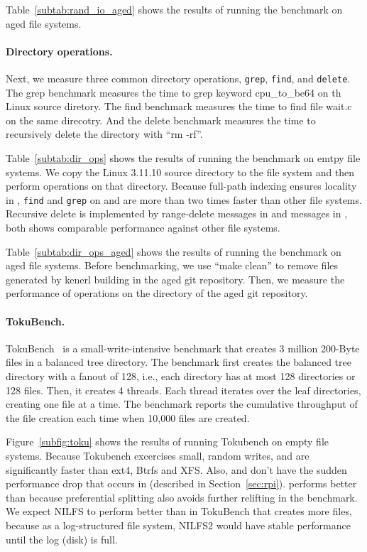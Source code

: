 Table~\ref{subtab:rand_io_aged} shows the results of running the benchmark on
aged file systems.

\paragraph{Directory operations.}
Next, we measure three common directory operations,
\texttt{grep}, \texttt{find}, and \texttt{delete}.
The grep benchmark measures the time to grep keyword cpu\_to\_be64 on th
Linux source diretory.
The find benchmark measures the time to find file wait.c on the same direcotry.
And the delete benchmark measures the time to recursively delete the directory
with ``rm -rf''.

Table~\ref{subtab:dir_ops} shows the results of running the benchmark on emtpy
file systems.
We copy the Linux 3.11.10 source directory to the file system and then
perform operations on that directory.
Because full-path indexing ensures locality in \betrfs, \texttt{find} and
\texttt{grep} on \betrfsFour and \betrfsFive are more than two times faster than
other file systems.
Recursive delete is implemented by range-delete messages in \betrfsFour and
\goto messages in \betrfsFive, both shows comparable performance against other
file systems.

Table~\ref{subtab:dir_ops_aged} shows the results of running the benchmark on
aged file systems.
Before benchmarking, we use ``make clean'' to remove files generated by kenerl
building in the aged git repository.
Then, we measure the performance of operations on the directory of the aged
git repository.

\paragraph{TokuBench.}

TokuBench~\citep{tokufs} is a small-write-intensive benchmark that creates 3
million 200-Byte files in a balanced tree directory.
The benchmark first creates the balanced tree directory with a fanout of 128,
i.e., each directory has at most 128 directories or 128 files.
Then, it creates 4 threads.
Each thread iterates over the leaf directories, creating one file at a time.
The benchmark reports the cumulative throughput of the file creation each time
when 10,000 files are created.

Figure~\ref{subfig:toku} shows the results of running Tokubench on empty file
systems.
Because Tokubench excercises small, random writes,
\betrfsFour and \betrfsFive are significantly faster than ext4, Btrfs and XFS.
Also, \betrfsFour and \betrfsFive don't have the sudden performance drop that
occurs in \betrfsThree (described in Section~\ref{sec:rpi}).
\betrfsFive performs better than \betrfsFour because preferential splitting
also avoids further relifting in the benchmark.
We expect NILFS to perform better than \betrfsFive in TokuBench that creates
more files,
because as a log-structured file system, NILFS2 would have stable performance
until the log (disk) is full.

